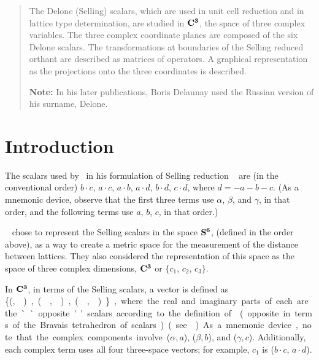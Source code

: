 \documentclass[preprint]{iucr}              %
\numberwithin{equation}{section}
\newcommand{\SVI}[0]{$\bf{S^{6}}$}
\newcommand{\CIII}[0]{$\bf{C^{3}}$}
\begin{document}
	\newcommand{\OPES}[0]{$E^3toS^6$}
	\newcommand{\OPESS}[0]{$$E^3toS^6$$}
	\newcommand{\MSVI}[0]{$M_{S^{6}}$}
	\newcommand{\MEIII}[0]{$M_{E^{3}}$}
	\newcommand{\Plus}[0]{\mathcal{P}}	
	\newcommand{\Minus}[0]{\mathcal{M}}
	
	\newcommand{\ci}[0]{$c_1$}
	\newcommand{\cii}[0]{$c_2$}
	\newcommand{\ciii}[0]{$c_3$}
	
	
	\begin{abstract}
		The Delone (Selling) scalars, which are used in 
		unit cell reduction and in lattice type determination,
		are studied in \CIII, the space of three complex variables.
		The three complex coordinate planes are composed of the six
		Delone scalars. The transformations at boundaries of the
		Selling reduced orthant are described as matrices of operators.
		A graphical representation as the projections onto the
		three coordinates is described.
		
		{\bf Note:}  In his later publications, Boris Delaunay used the Russian version of his surname, Delone.\\
		
		
	\end{abstract}
	
	
	\section{Introduction}
	
	The scalars used by~ in his formulation of Selling reduction ~\cite{Selling1874}
	are (in the conventional order) $b \cdot c$, $a \cdot c$, $a \cdot b$, $a \cdot d$, 
	$b \cdot d$, $c \cdot d$, where $d = -a-b-c$. 
	(As a mnemonic device, 
	observe that the first three terms use
	$\alpha$, $\beta$, and $\gamma$, 
	in that order, 
	and the following terms use $a$, $b$, $c$, in that order.)
	
	~ chose to 
	represent the Selling scalars in the space \SVI{},
	\Svec{} (defined in the order above), 
	as a way to create a metric space
	for the measurement of the distance between lattices. 
	They also considered the representation 
	of this space as the
	space of three complex dimensions, \CIII{} or 
	{$\{c_1$}, {$c_2$}, {$c_3\}$}. 	
	
	In \CIII{}, in terms of the Selling scalars, 
	a vector is defined as \{(\si,\siv ), (\sii,\sv),(\siii,\svi)\}, 
	where the real and imaginary parts
	of each are the ``opposite'' scalars 
	according to the definition of~
	(opposite in terms of the Bravais tetrahedron of scalars) (see~).
	As a mnemonic device, 
	note that the complex components involve ($\alpha,a$), ($\beta, b$), and ($\gamma,c$).
	Additionally, each complex term uses all 
	four three-space vectors; for example, $c_1$ is ($b \cdot c$, $a \cdot d$).
	
\end{document}
